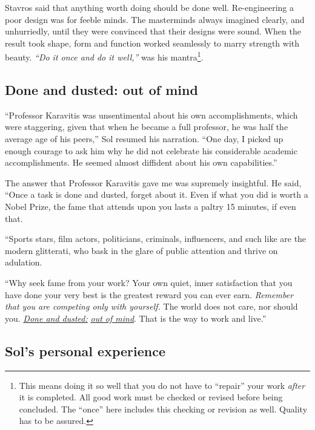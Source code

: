 \documentclass[
  a4paper,
]{article}
\begin{document}
Stavros said that anything worth doing should be done well.
Re-engineering a poor design was for feeble minds. The masterminds
always imagined clearly, and unhurriedly, until they were convinced that
their designs were sound. When the result took shape, form and function
worked seamlessly to marry strength with beauty. \emph{``Do it once and
do it well,''} was his mantra\footnote{This means doing it so well that
  you do not have to ``repair'' your work \emph{after} it is completed.
  All good work must be checked or revised before being concluded. The
  ``once'' here includes this checking or revision as well. Quality has
  to be assured.  \normalfont}.

\hypertarget{done-and-dusted-out-of-mind}{%
\subsection{Done and dusted: out of
mind}\label{done-and-dusted-out-of-mind}}

``Professor Karavitis was unsentimental about his own accomplishments,
which were staggering, given that when he became a full professor, he
was half the average age of his peers,'' Sol resumed his narration.
``One day, I picked up enough courage to ask him why he did not
celebrate his considerable academic accomplishments. He seemed almost
diffident about his own capabilities.''

The answer that Professor Karavitis gave me was supremely insightful. He
said, ``Once a task is done and dusted, forget about it. Even if what
you did is worth a Nobel Prize, the fame that attends upon you lasts a
paltry 15 minutes, if even that.

``Sports stars, film actors, politicians, criminals, influencers, and
such like are the modern glitterati, who bask in the glare of public
attention and thrive on adulation.

``Why seek fame from your work? Your own quiet, inner satisfaction that
you have done your very best is the greatest reward you can ever earn.
\emph{Remember that you are competing only with yourself.} The world
does not care, nor should you.
\href{https://www.macmillandictionary.com/dictionary/british/be-done-and-dusted}{\emph{Done
and dusted:}}
\href{https://www.merriam-webster.com/dictionary/out\%20of\%20mind}{\emph{out
of mind}}. That is the way to work and live.''

\hypertarget{sols-personal-experience}{%
\subsection{Sol's personal experience}\label{sols-personal-experience}}
\end{document}
